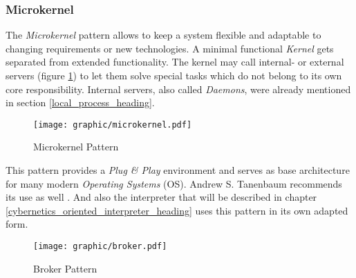 %
%
%
%
%
%
%

\subsubsection{Microkernel}
\label{microkernel_heading}

The \emph{Microkernel} pattern \cite{buschmann} allows to keep a system flexible
and adaptable to changing requirements or new technologies. A minimal functional
\emph{Kernel} gets separated from extended functionality. The kernel may call
internal- or external servers (figure \ref{microkernel_figure}) to let them
solve special tasks which do not belong to its own core responsibility. Internal
servers, also called \emph{Daemons}, were already mentioned in section
\ref{local_process_heading}.

\begin{figure}[ht]
    \begin{center}
        \texttt{[image: graphic/microkernel.pdf]}
        \caption{Microkernel Pattern}
        \label{microkernel_figure}
    \end{center}
\end{figure}

This pattern provides a \emph{Plug \& Play} environment and serves as base
architecture for many modern \emph{Operating Systems} (OS). Andrew S. Tanenbaum
recommends its use as well \cite{tanenbaum2001}. And also the interpreter that
will be described in chapter \ref{cybernetics_oriented_interpreter_heading}
uses this pattern in its own adapted form.

%
%

\begin{figure}[ht]
    \begin{center}
        \texttt{[image: graphic/broker.pdf]}
        \caption{Broker Pattern}
        \label{broker_figure}
    \end{center}
\end{figure}

\clearpage

